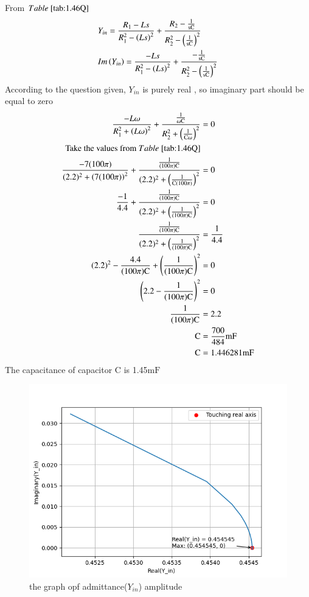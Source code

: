 \documentclass[a4,12pt,onecolumn]{IEEEtran}
\begin{document}
From $\tabref{tab:1.46Q}$
\begin{align} 
&Y_{in}=\frac{R_1-Ls}{R_1^2-\left(Ls\right)^2} + \frac{R_2-\frac{1}{ \text{sC}}}{R_2^2-\left(\frac{1}{ \text{sC}}\right)^2}\\
&Im\left(Y_{in}\right)=\frac{-Ls}{R_1^2-\left(Ls\right)^2} + \frac{-\frac{1}{ \text{sC}}}{R_2^2-\left(\frac{1}{ \text{sC}}\right)^2}
\end{align}
According to the question given, $Y_{in}$ is purely real , so imaginary part should be equal to zero\\
\begin{align}
\frac{-L\omega}{R_1^2+\brak{L\omega}^2} + \frac{\frac{1}{ \omega \text{C}}}{R_2^2+\brak{\frac{1}{ \text{C}\omega}}^2}&=0\\
\text{Take the values from $\tabref{tab:1.46Q}$}\\
 \frac{-7(100\pi)}{(2.2)^2+\brak{7(100\pi)}^2} + \frac{\frac{1}{ (100\pi) \text{C}}}{(2.2)^2+\brak{\frac{1}{\text{C}(100\pi)}}^2}&=0\\
 \frac{-1}{4.4}+\frac{\frac{1}{ (100\pi) \text{C}}}{(2.2)^2+\brak{\frac{1}{ (100\pi) \text{C}}}^2}&=0\\ 
 \frac{\frac{1}{ (100\pi) \text{C}}}{(2.2)^2+\brak{\frac{1}{ (100\pi) \text{C}}}^2}&=\frac{1}{4.4}\\
  (2.2)^2-\frac{4.4}{ (100\pi) \text{C}}+\brak{\frac{1}{ (100\pi) \text{C}}}^2&=0\\
 \brak{2.2-\frac{1}{ (100\pi) \text{C}}}^2&=0\\
 \frac{1}{ (100\pi) \text{C}}&=2.2\\
 \text{C}&=\frac{700}{484}\text{mF}\\
 \text{C}&=1.446281\text{mF}
\end{align}
The capacitance of capacitor $\text{C}$ is 1.45$\text{mF}$
\begin{figure}[ht!]
\includegraphics[width=\columnwidth]{figs/fig2.png}
\caption{\large{the graph opf admittance($Y_{in}$) amplitude}}
\end{figure}
\end{document}
